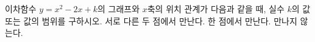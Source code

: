 이차함수 $y=x^2-2x+k$의 그래프와 $x$축의 위치 관계가 다음과 같을 때, 실수 $k$의 값 또는 값의 범위를 구하시오.
 서로 다른 두 점에서 만난다.
 한 점에서 만난다.
 만나지 않는다.
